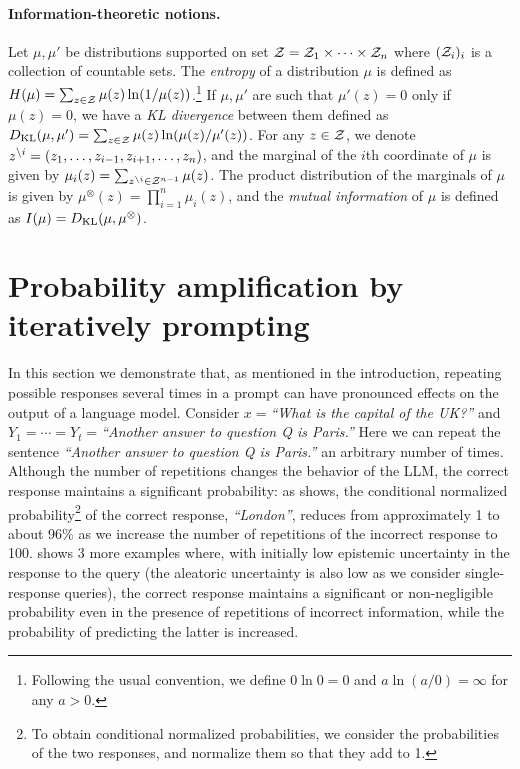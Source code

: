 \documentclass[a4paper]{article}
\theoremstyle{plain}
\theoremstyle{definition}
\theoremstyle{plain}
\begin{document}
\paragraph{Information-theoretic notions.}
\label{par:it}
%
Let $\mu, \mu'$ be distributions supported on set $\mathcal{Z} = \mathcal{Z}_1 \times \cdots \times \mathcal{Z}_n$ where $(\mathcal{Z}_i)_i$ is a collection of countable sets.
The \emph{entropy} of a distribution $\mu$ is defined as $H(\mu) = \sum_{z \in \mathcal{Z}} \mu(z)\ln(1/\mu(z))$.\footnote{Following the usual convention, we define $0 \ln 0 = 0$ and $a \ln (a/0) = \infty$ for any $a>0$.}
If $\mu, \mu'$ are such that $\mu'(z) = 0$ only if $\mu(z) = 0$, we have a \emph{\ac{KL} divergence} between them defined as $D_{\mathrm{KL}}(\mu, \mu') = \sum_{z \in \mathcal{Z}} \mu(z) \ln (\mu(z) / \mu'(z))$.
For any $z \in \mathcal{Z}$, we denote $z^{\backslash i} = (z_1,\ldots, z_{i-1}, z_{i+1}, \ldots, z_n)$, and the marginal of the $i$th coordinate of $\mu$ is given by
$\mu_i(z)=\sum_{z^{\backslash i} \in \mathcal{Z}^{n-1}} \mu(z)$. The product distribution of the marginals of $\mu$ is given by $\mu^{\otimes}(z) = \prod_{i=1}^n \mu_i(z)$, %
and the \emph{mutual information} of $\mu$ is defined as $I(\mu) = D_{\mathrm{KL}}(\mu, \mu^{\otimes})$.


\section{Probability amplification by iteratively prompting} %
  \label{sec:prompting}
In this section we demonstrate that, as mentioned in the introduction, repeating possible responses several times in a prompt can have pronounced effects on the output of a language model. 
%
Consider $x=$\emph{``What is the capital of the UK?''} and $Y_1=\cdots=Y_t=$\emph{``Another answer to question Q is Paris.''} Here we can repeat the sentence \emph{``Another answer to question Q is Paris.''} an arbitrary number of times. Although the number of repetitions changes the behavior of the LLM, the correct response maintains a significant probability:
as  shows, the conditional normalized probability\footnote{To obtain conditional normalized probabilities, we consider the probabilities of the two responses, and normalize them so that they add to 1.} of the correct response, \emph{``London''}, reduces from approximately 1 to about 96\% as we increase the number of repetitions of the incorrect response to 100. 
 shows 3 more examples where, with initially low epistemic uncertainty in the response to the query (the aleatoric uncertainty is also low as we consider single-response queries), the correct response maintains a significant or non-negligible probability even in the presence of repetitions of incorrect information, while the probability of predicting the latter is increased.
\end{document}
